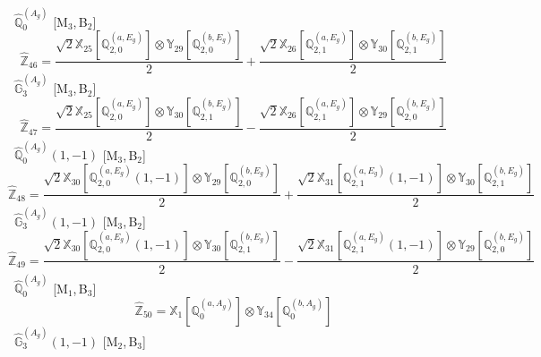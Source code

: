 \documentclass[fleqn,10pt,landscape]{article}
\begin{document}
\begin{itemize}
\begin{dmath*}
\end{dmath*}
\vspace{4mm}
\noindent {} $\,\,\,\hat{\mathbb{Q}}_{0}^{(A_{g})}$ [M$_{3}$,\,B$_{2}$]
\begin{dmath*}
\hat{\mathbb{Z}}_{46}=\frac{\sqrt{2} \mathbb{X}_{25}[\mathbb{Q}_{2,0}^{(a,E_{g})}] \otimes\mathbb{Y}_{29}[\mathbb{Q}_{2,0}^{(b,E_{g})}]}{2} + \frac{\sqrt{2} \mathbb{X}_{26}[\mathbb{Q}_{2,1}^{(a,E_{g})}] \otimes\mathbb{Y}_{30}[\mathbb{Q}_{2,1}^{(b,E_{g})}]}{2}
\end{dmath*}
\vspace{4mm}
\noindent {} $\,\,\,\hat{\mathbb{G}}_{3}^{(A_{g})}$ [M$_{3}$,\,B$_{2}$]
\begin{dmath*}
\hat{\mathbb{Z}}_{47}=\frac{\sqrt{2} \mathbb{X}_{25}[\mathbb{Q}_{2,0}^{(a,E_{g})}] \otimes\mathbb{Y}_{30}[\mathbb{Q}_{2,1}^{(b,E_{g})}]}{2} - \frac{\sqrt{2} \mathbb{X}_{26}[\mathbb{Q}_{2,1}^{(a,E_{g})}] \otimes\mathbb{Y}_{29}[\mathbb{Q}_{2,0}^{(b,E_{g})}]}{2}
\end{dmath*}
\vspace{4mm}
\noindent {} $\,\,\,\hat{\mathbb{Q}}_{0}^{(A_{g})}(1,-1)$ [M$_{3}$,\,B$_{2}$]
\begin{dmath*}
\hat{\mathbb{Z}}_{48}=\frac{\sqrt{2} \mathbb{X}_{30}[\mathbb{Q}_{2,0}^{(a,E_{g})}(1,-1)] \otimes\mathbb{Y}_{29}[\mathbb{Q}_{2,0}^{(b,E_{g})}]}{2} + \frac{\sqrt{2} \mathbb{X}_{31}[\mathbb{Q}_{2,1}^{(a,E_{g})}(1,-1)] \otimes\mathbb{Y}_{30}[\mathbb{Q}_{2,1}^{(b,E_{g})}]}{2}
\end{dmath*}
\vspace{4mm}
\noindent {} $\,\,\,\hat{\mathbb{G}}_{3}^{(A_{g})}(1,-1)$ [M$_{3}$,\,B$_{2}$]
\begin{dmath*}
\hat{\mathbb{Z}}_{49}=\frac{\sqrt{2} \mathbb{X}_{30}[\mathbb{Q}_{2,0}^{(a,E_{g})}(1,-1)] \otimes\mathbb{Y}_{30}[\mathbb{Q}_{2,1}^{(b,E_{g})}]}{2} - \frac{\sqrt{2} \mathbb{X}_{31}[\mathbb{Q}_{2,1}^{(a,E_{g})}(1,-1)] \otimes\mathbb{Y}_{29}[\mathbb{Q}_{2,0}^{(b,E_{g})}]}{2}
\end{dmath*}
\vspace{4mm}
\noindent {} $\,\,\,\hat{\mathbb{Q}}_{0}^{(A_{g})}$ [M$_{1}$,\,B$_{3}$]
\begin{dmath*}
\hat{\mathbb{Z}}_{50}=\mathbb{X}_{1}[\mathbb{Q}_{0}^{(a,A_{g})}] \otimes\mathbb{Y}_{34}[\mathbb{Q}_{0}^{(b,A_{g})}]
\end{dmath*}
\vspace{4mm}
\noindent {} $\,\,\,\hat{\mathbb{G}}_{3}^{(A_{g})}(1,-1)$ [M$_{2}$,\,B$_{3}$]

\end{itemize}
\end{document}
